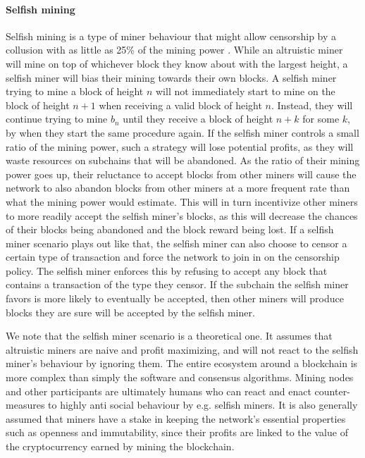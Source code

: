 \paragraph{Selfish mining}
Selfish mining is a type of miner behaviour that might allow censorship by a collusion with as little as 25\% of the mining power \cite{eyal_majority_2018}. While an altruistic miner will mine on top of whichever block they know about with the largest height, a selfish miner will bias their mining towards their own blocks. A selfish miner trying to mine a block of height $n$ will not immediately start to mine on the block of height $n+1$ when receiving a valid block of height $n$. Instead, they will continue trying to mine $b_n$ until they receive a block of height $n+k$ for some $k$, by when they start the same procedure again. 
If the selfish miner controls a small ratio of the mining power, such a strategy will lose potential profits, as they will waste resources on subchains that will be abandoned. As the ratio of their mining power goes up, their reluctance to accept blocks from other miners will cause the network to also abandon blocks from other miners at a more frequent rate than what the mining power would estimate. This will in turn incentivize other miners to more readily accept the selfish miner's blocks, as this will decrease the chances of their blocks being abandoned and the block reward being lost. 
If a selfish miner scenario plays out like that, the selfish miner can also choose to censor a certain type of transaction and force the network to join in on the censorship policy. The selfish miner enforces this by refusing to accept any block that contains a transaction of the type they censor. If the subchain the selfish miner favors is more likely to eventually be accepted, then other miners will produce blocks they are sure will be accepted by the selfish miner.

We note that the selfish miner scenario is a theoretical one. It assumes that altruistic miners are naive and profit maximizing, and will not react to the selfish miner's behaviour by ignoring them. The entire ecosystem around a blockchain is more complex than simply the software and consensus algorithms. Mining nodes and other participants are ultimately humans who can react and enact counter-measures to highly anti social behaviour by e.g. selfish miners. It is also generally assumed that miners have a stake in keeping the network's essential properties such as openness and immutability, since their profits are linked to the value of the cryptocurrency earned by mining the blockchain.
